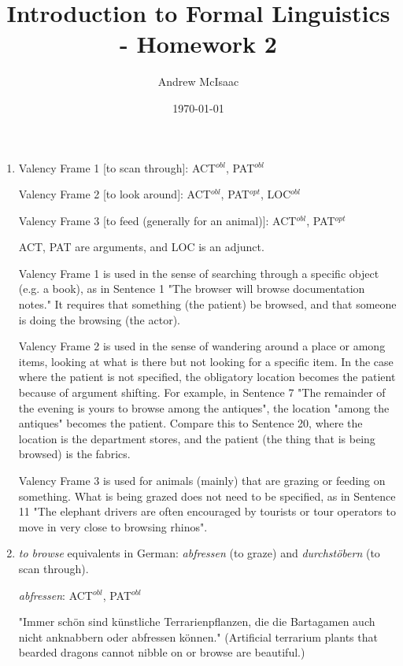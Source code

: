 \documentclass[a4paper]{article}
\title{Introduction to Formal Linguistics - Homework 2}
\date{\today}
\author{Andrew McIsaac}
\begin{document}
\maketitle

\begin{enumerate}
\item %



Valency Frame 1 [to scan through]: ACT$^{obl}$, PAT$^{obl}$
	
Valency Frame 2 [to look around]: ACT$^{obl}$, PAT$^{opt}$, LOC$^{obl}$

Valency Frame 3 [to feed (generally for an animal)]: ACT$^{obl}$, PAT$^{opt}$

ACT, PAT are arguments, and LOC is an adjunct.

Valency Frame 1 is used in the sense of searching through a specific object
(e.g. a book), as in Sentence 1 "The browser will browse documentation notes."
It requires that something (the patient) be browsed, and that someone is doing
the browsing (the actor).

Valency Frame 2 is used in the sense of wandering around a place or among items,
looking at what is there but not looking for a specific item. In the case where
the patient is not specified, the obligatory location becomes the patient
because of argument shifting. For example, in Sentence 7 "The remainder of the
evening is yours to browse among the antiques", the location "among the 
antiques" becomes the patient. Compare this to Sentence 20, where the location
is the department stores, and the patient (the thing that is being browsed) is
the fabrics.

Valency Frame 3 is used for animals (mainly) that are grazing or feeding on
something. What is being grazed does not need to be specified, as in Sentence
11 "The elephant drivers are often encouraged by tourists or tour operators to 
move in very close to browsing rhinos".
\item %

\textit{to browse} equivalents in German: \textit{abfressen} (to graze) and
\textit{durchstöbern} (to scan through).

\textit{abfressen}: ACT$^{obl}$, PAT$^{obl}$

"Immer schön sind künstliche Terrarienpflanzen, die die Bartagamen auch nicht
anknabbern oder abfressen können." (Artificial terrarium plants that bearded
dragons cannot nibble on or browse are beautiful.)



\end{enumerate}
\end{document}

